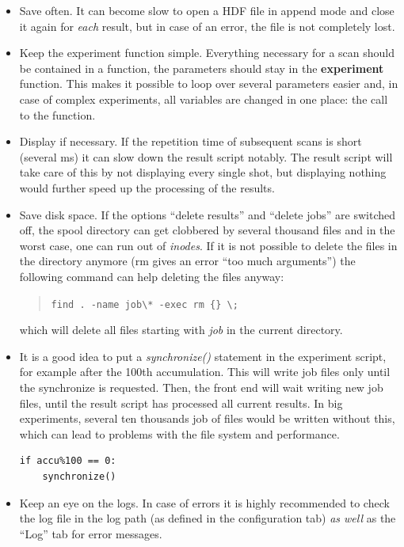 \documentclass[12pt, a4paper, BCOR10mm, twoside, titlepage, headinclude]{scrbook}
\begin{document}
\begin{itemize}
\item Save often. It can become slow to open a \textsf{HDF} file in append mode and close it again for \emph{each} result, but in case of an error, the file is not completely lost.
\item Keep the experiment function simple. Everything necessary for a scan should be contained in a function, the parameters should stay in the \textbf{experiment} function. This makes it possible to loop over several parameters easier and, in case of complex experiments, all variables are changed in one place: the call to the function.
\item Display if necessary. If the repetition time of subsequent scans is short (several ms) it can slow down the result script notably. The result script will take care of this by not displaying every single shot, but displaying nothing would further speed up the processing of the results.
\item Save disk space. If the options ``delete results'' and ``delete jobs'' are switched off, the spool directory can get clobbered by several thousand files and  in the worst case, one can run out of \emph{inodes}. If it is not possible to delete the files in the directory anymore (rm gives an error ``too much arguments'') the following command  can help deleting the files anyway: 
\begin{quote}
\lstinline!find . -name job\* -exec rm {} \;!
\end{quote} which will delete all files starting with \textit{job} in the current directory.
\item It is a good idea to put a \emph{synchronize()} statement in the experiment script, for example after the 100th accumulation. This will write job files only until the synchronize is requested. Then, the front end will wait writing new job files, until the result script has processed all current results. In big experiments, several ten thousands job of files would be written without this, which can lead to problems with the file system and performance.
\begin{lstlisting}
if accu%100 == 0:
	synchronize()
\end{lstlisting}
\item Keep an eye on the logs. In case of errors it is highly recommended to check the log file in the log path (as defined in the configuration tab) \emph{as well} as the ``Log'' tab for error messages.
\end{itemize}
\end{document}
